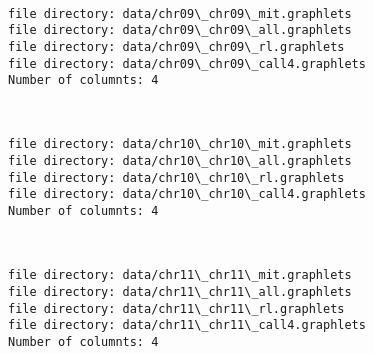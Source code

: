 \documentclass[11pt]{article}
\begin{document}
    \begin{center}
    \end{center}
    { \hspace*{\fill} \\}
    
    \begin{Verbatim}[commandchars=\\\{\}]
file directory: data/chr09\_chr09\_mit.graphlets
file directory: data/chr09\_chr09\_all.graphlets
file directory: data/chr09\_chr09\_rl.graphlets
file directory: data/chr09\_chr09\_call4.graphlets
Number of columnts: 4

    \end{Verbatim}

    \begin{center}
    \end{center}
    { \hspace*{\fill} \\}
    
    \begin{Verbatim}[commandchars=\\\{\}]
file directory: data/chr10\_chr10\_mit.graphlets
file directory: data/chr10\_chr10\_all.graphlets
file directory: data/chr10\_chr10\_rl.graphlets
file directory: data/chr10\_chr10\_call4.graphlets
Number of columnts: 4

    \end{Verbatim}

    \begin{center}
    \end{center}
    { \hspace*{\fill} \\}
    
    \begin{Verbatim}[commandchars=\\\{\}]
file directory: data/chr11\_chr11\_mit.graphlets
file directory: data/chr11\_chr11\_all.graphlets
file directory: data/chr11\_chr11\_rl.graphlets
file directory: data/chr11\_chr11\_call4.graphlets
Number of columnts: 4

    \end{Verbatim}

    \begin{center}
    \end{center}
    { \hspace*{\fill} \\}
    
\end{document}
